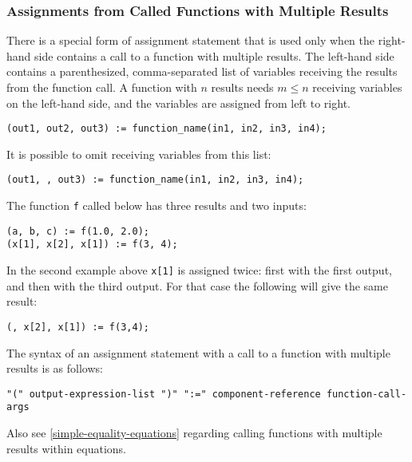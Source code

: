 \subsubsection{Assignments from Called Functions with Multiple Results}\label{assignments-from-called-functions-with-multiple-results}

There is a special form of assignment statement that is used only when the right-hand side contains a call to a function with multiple results.
The left-hand side contains a parenthesized, comma-separated list of variables receiving the results from the function call.
A function with $n$ results needs $m \leq n$ receiving variables on the left-hand side, and the variables are assigned from left to right.

\begin{lstlisting}[language=modelica]
(out1, out2, out3) := function_name(in1, in2, in3, in4);
\end{lstlisting}

It is possible to omit receiving variables from this list:
\begin{lstlisting}[language=modelica]
(out1, , out3) := function_name(in1, in2, in3, in4);
\end{lstlisting}

\begin{example}
The function \lstinline!f! called below has three results and two inputs:
\begin{lstlisting}[language=modelica]
(a, b, c) := f(1.0, 2.0);
(x[1], x[2], x[1]) := f(3, 4);
\end{lstlisting}
In the second example above \lstinline!x[1]! is assigned twice: first with the first output, and then with the third output.
For that case the following will give the same result:
\begin{lstlisting}[language=modelica]
(, x[2], x[1]) := f(3,4);
\end{lstlisting}
\end{example}

The syntax of an assignment statement with a call to a function with multiple results is as follows:
\begin{lstlisting}[language=grammar]
"(" output-expression-list ")" ":=" component-reference function-call-args
\end{lstlisting}

\begin{nonnormative}
Also see \cref{simple-equality-equations} regarding calling functions with multiple results within equations.
\end{nonnormative}

